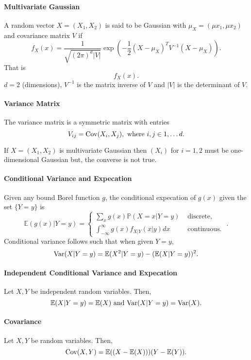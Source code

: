 \paragraph{Multivariate Gaussian}
A random vector \(X = (X_1, X_2)\) is said to be Gaussian with
 \(\mu_X = (\mu x_1, \mu x_2)\) and covariance matrix \(V\) if
  \[
     f_X(x) = \frac{1}{\sqrt{(2\pi)^d |V|}}
     \exp \left( -\frac{1}{2} (X-\mu_X)^T V^{-1}(X- \mu_X) \right) 
 .\]
That is \[
    f_X(x)
.\]
 \(d = 2\) (dimensions),  \(V^{-1}\) is the matrix inverse of  \(V\)
 and  \(|V|\) is the determinant of  \(V\).

 \paragraph{Variance Matrix}
 The variance matrix is a symmetric matrix with entries \[
     V_{ij} = \mathrm{Cov}(X_i, X_j), \text{ where } i, j \in 1, \ldots d
 .\]

 If \(X = (X_1, X_2)\) is multivariate Gaussian then  \((X_i)\)
 for  \(i = 1, 2\) must be one-dimensional Gaussian but, the converse is
 not true.
 

\paragraph{Conditional Variance and Expecation}
Given any bound Borel function \(g\), the conditional expecation of  \(g(x)\)
given the set  \(\{Y = y\} \) is \[
    \mathbb{E}(g(x) | Y = y)
    = \begin{cases}
        \sum_{x} g(x) \mathbb{P}(X = x | Y = y) & \text{ discrete, } \\
        \int_{-\infty}^{\infty}  g(x) f_{X | Y} (x | y) dx
            & \text{ continuous. }
    \end{cases}
.\]
Conditional variance follows such that when given \( Y=y \), \[
    \mathrm{Var}(X | Y = y)
    =
    \mathbb{E}(X^2 | Y = y) - ( \mathbb{E}(X | Y = y) )^2
.\]

\paragraph{Independent Conditional Variance and Expecation}
Let \(X, Y\) be independent random variables. Then,  \[
    \mathbb{E}(X | Y = y) = \mathbb{E}(X)
    \text{ and }
    \mathrm{Var}(X | Y = y) = \mathrm{Var}(X)
.\] 

\paragraph{Covariance}
Let \(X, Y\) be random variables. Then,  \[
    \mathrm{Cov}(X, Y) =
    \mathbb{E}((X - \mathbb{E}(X))) (Y - \mathbb{E}(Y))
.\]

